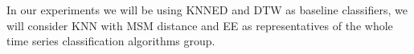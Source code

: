 In our experiments we will be using KNNED and DTW as baseline classifiers, we will consider KNN with MSM distance and EE as representatives
of the whole time series classification algorithms group.
